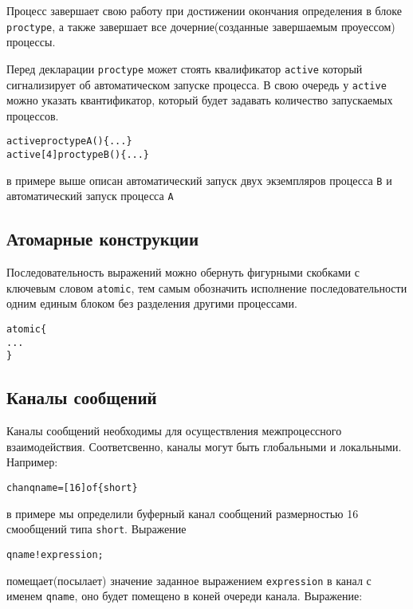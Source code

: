 \documentclass[12pt, twoside]{report}
\begin{document}
Процесс завершает свою работу при достижении окончания определения в блоке \texttt{proctype}, а также завершает
все дочерние(созданные завершаемым проуессом) процессы.

Перед декларации \texttt{proctype} может стоять квалификатор \texttt{active} который сигнализирует
об автоматическом запуске процесса. В свою очередь у \texttt{active} можно указать квантификатор,
который будет задавать количество запускаемых процессов.

\begin{alltt}
active proctype A() \{ ... \}
active [4] proctype B() \{ ... \}
\end{alltt}
в примере выше описан автоматический запуск двух экземпляров процесса \texttt{B}
и автоматический запуск процесса \texttt{A}

\subsection*{Атомарные конструкции}\label{promela_language_ATOMIC}

Последовательность выражений можно обернуть фигурными скобками с ключевым словом \texttt{atomic},
тем самым обозначить исполнение последовательности одним единым блоком без разделения другими процессами.

\begin{alltt}
atomic \{
  ...
\}
\end{alltt}


\subsection*{Каналы сообщений}\label{promela_language_CHAN}

Каналы сообщений необходимы для осуществления межпроцессного взаимодействия.
Соответсвенно, каналы могут быть глобальными и локальными. Например:

\begin{alltt}
chan qname = [16] of \{short\}
\end{alltt}

в примере мы определили буферный канал сообщений размерностью 16 смообщений типа
\texttt{short}. Выражение

\begin{alltt}
qname ! expression;
\end{alltt}

помещает(посылает) значение заданное выражением \texttt{expression} в канал с именем
\texttt{qname}, оно будет помещено в коней очереди канала. Выражение:
\end{document}
